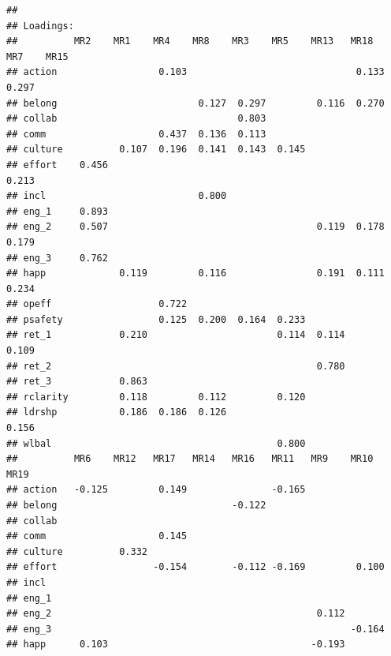 \documentclass[
]{book}
\begin{document}
\begin{verbatim}
## 
## Loadings:
##          MR2    MR1    MR4    MR8    MR3    MR5    MR13   MR18   MR7    MR15  
## action                  0.103                              0.133  0.297       
## belong                         0.127  0.297         0.116  0.270              
## collab                                0.803                                   
## comm                    0.437  0.136  0.113                                   
## culture          0.107  0.196  0.141  0.143  0.145                            
## effort    0.456                                                          0.213
## incl                           0.800                                          
## eng_1     0.893                                                               
## eng_2     0.507                                     0.119  0.178         0.179
## eng_3     0.762                                                               
## happ             0.119         0.116                0.191  0.111  0.234       
## opeff                   0.722                                                 
## psafety                 0.125  0.200  0.164  0.233                            
## ret_1            0.210                       0.114  0.114                0.109
## ret_2                                               0.780                     
## ret_3            0.863                                                        
## rclarity         0.118         0.112         0.120                            
## ldrshp           0.186  0.186  0.126                              0.156       
## wlbal                                        0.800                            
##          MR6    MR12   MR17   MR14   MR16   MR11   MR9    MR10   MR19  
## action   -0.125         0.149               -0.165                     
## belong                               -0.122                            
## collab                                                                 
## comm                    0.145                                          
## culture          0.332                                                 
## effort                 -0.154        -0.112 -0.169         0.100       
## incl                                                                   
## eng_1                                                                  
## eng_2                                               0.112              
## eng_3                                                     -0.164       
## happ      0.103                                    -0.193              

\end{verbatim}
\end{document}
